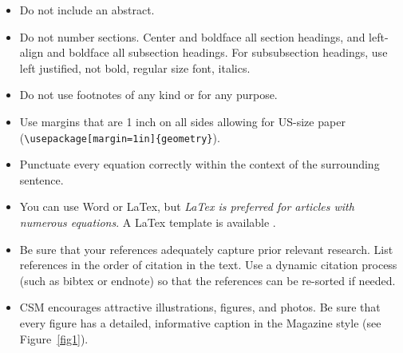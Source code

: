 \begin{itemize}
\item Do not include an abstract. %
\item Do not number sections.  Center and boldface all section headings, and left-align and boldface all subsection headings. For subsubsection headings, use left justified, not bold, regular size font, italics.
\item Do not use footnotes of any kind or for any purpose. %
\item Use margins that are 1 inch on all sides allowing for US-size paper (\verb!\usepackage[margin=1in]{geometry}!). 
\item Punctuate every equation correctly within the context of the surrounding sentence.
\item You can use Word or LaTex, but \textit{LaTex is preferred for articles with numerous equations}. 
A LaTex template is available \cite{LT}.
\item Be sure that your references adequately capture prior relevant research. List references in the order of citation in the text. Use a dynamic citation process (such as bibtex or endnote) so that the references can be re-sorted if needed.
\item CSM encourages attractive illustrations, figures, and photos.  
Be sure that every figure has a detailed, informative caption in the Magazine style (see Figure~\ref{fig1}). 
\end{itemize}

